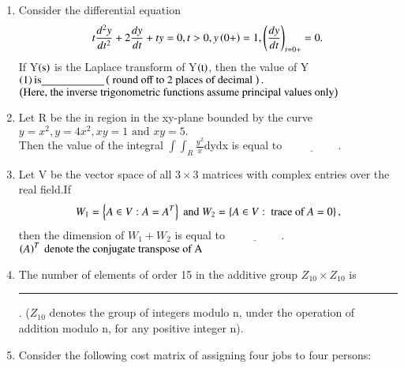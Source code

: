 \documentclass[journal]{IEEEtran}
\begin{document}
\begin{enumerate} [start=40]
$\brak{\mathbb{R} \text{ is the set of all real number }}$\\
Which of the above statements is/are TRUE?
\begin{multicols}{2}
    \begin{enumerate}
         \item  both I and II  
         \item I  only 
         \item II  only 
        \item  Neither I or II 
    \end{enumerate}
\end{multicols}   
\bigskip
\item Consider the differential equation
\begin{align*}
    t\frac{d^{2}y}{dt^{2}}+2\frac{dy}{dt}+ty=0,t>0,y\left(0+\right)=1,\left(\frac{dy}{dt}\right)_{t=0+}=0.
\end{align*}
 If Y$\left(\text{s}\right)$ is the Laplace transform of Y$\left(\text{t}\right)$, then the value of Y$\left(1\right) \text{is} \underline{\hspace{2cm}}\left(\text{ round off to 2 places of decimal }\right).$\\
 $\left(\text{Here, the inverse trigonometric functions assume principal values only}\right)$
 \bigskip
 \item Let R be the in region in the xy-plane bounded by the curve 
 $y=x^{2},y=4x^{2},xy=1\text{ and } xy=5.$\\
 Then the value of the integral $\int\int_{R}\frac{y^{2}}{x}$dydx is equal to $\underline{\hspace{2cm}}.$
\bigskip
\item Let V be the vector space of all $3\times3$ matrices with complex entries over the real field.If
\begin{align*}
    W_{1}=\left\{A\in V:A=A^{T}\right\} \text{ and } W_{2}=\left\{A\in V: \text{ trace of }A=0\right\},
\end{align*}
then the dimension of $W_{1} + W_{2}$ is equal to $\underline{\hspace{2cm}}.$
$\left(A\right)^{T}{\text{ denote the conjugate transpose of A}}$
\bigskip
\item The number of elements of order 15 in the additive group $Z_{10}\times Z_{10}$ is \rule{1cm}{0.15mm}. ($Z_{10}$ denotes the group of integers modulo n, under the operation of addition modulo n, for any positive integer n).

\bigskip
\item Consider the following cost matrix of assigning four jobs to four persons:
\begin{figure}[H]
\centering
{}
\end{figure}
\end{enumerate}
\end{document}
